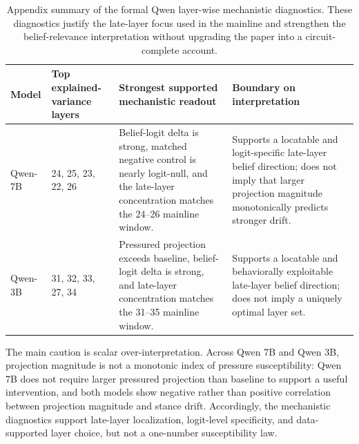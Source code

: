 \documentclass[11pt]{article}
\begin{document}
\begin{table}[h]
  \centering
  \small
  \begin{tabular}{p{1.15in}p{1.55in}p{1.55in}p{2.35in}}
    \toprule
    Model & Top explained-variance layers & Strongest supported mechanistic readout & Boundary on interpretation \\
    \midrule
    Qwen-7B & 24, 25, 23, 22, 26 & Belief-logit delta is strong, matched negative control is nearly logit-null, and the late-layer concentration matches the 24--26 mainline window. & Supports a locatable and logit-specific late-layer belief direction; does not imply that larger projection magnitude monotonically predicts stronger drift. \\
    Qwen-3B & 31, 32, 33, 27, 34 & Pressured projection exceeds baseline, belief-logit delta is strong, and late-layer concentration matches the 31--35 mainline window. & Supports a locatable and behaviorally exploitable late-layer belief direction; does not imply a uniquely optimal layer set. \\
    \bottomrule
  \end{tabular}
  \caption{Appendix summary of the formal Qwen layer-wise mechanistic diagnostics. These diagnostics justify the late-layer focus used in the mainline and strengthen the belief-relevance interpretation without upgrading the paper into a circuit-complete account.}
  \label{tab:appendix_qwen_mech_diag}
\end{table}

The main caution is scalar over-interpretation.
Across Qwen 7B and Qwen 3B, projection magnitude is not a monotonic index of pressure susceptibility: Qwen 7B does not require larger pressured projection than baseline to support a useful intervention, and both models show negative rather than positive correlation between projection magnitude and stance drift.
Accordingly, the mechanistic diagnostics support late-layer localization, logit-level specificity, and data-supported layer choice, but not a one-number susceptibility law.
\end{document}
